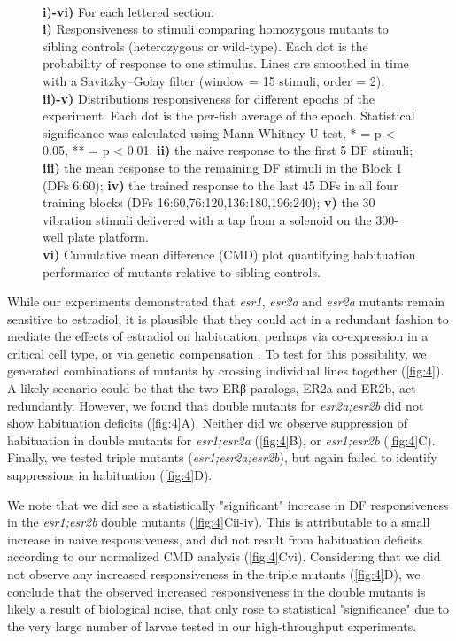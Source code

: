 \documentclass[9.5pt,lineno]{RandlettLab_elife}
\begin{document}
{\begin{figure}
\begin{fullwidth}
\begin{center}
{\\ \textbf{i)-vi)} For each lettered section: 
\\ \textbf{i)} Responsiveness to stimuli comparing homozygous mutants to sibling controls (heterozygous or wild-type). 
Each dot is the probability of response to one stimulus. Lines are smoothed in time with a Savitzky–Golay filter (window = 15 stimuli, order = 2).
\\ \textbf{ii)-v)} Distributions responsiveness for different epochs of the experiment. Each dot is the per-fish average of the epoch. 
Statistical significance was calculated using Mann-Whitney U test, * = p < 0.05, ** = p < 0.01.
\textbf{ii)} the naive response to the first 5 DF stimuli; \textbf{iii)} the mean response to the remaining DF stimuli in the Block 1 (DFs 6:60); \textbf{iv)} the trained response to the last 45 DFs in all four training blocks (DFs 16:60,76:120,136:180,196:240); \textbf{v)} the 30 vibration stimuli delivered with a tap from a solenoid on the 300-well plate platform.
\\ \textbf{vi)} Cumulative mean difference (CMD) plot quantifying habituation performance of mutants relative to sibling controls.
}
\label{fig:4}

\end{center}
\end{fullwidth}
\end{figure}

While our experiments demonstrated that \emph{esr1}, \emph{esr2a} and \emph{esr2a} mutants remain sensitive to estradiol, it is plausible that they could act in a redundant fashion to mediate the effects of estradiol on habituation, perhaps via co-expression in a critical cell type, or via genetic compensation \citep{El-Brolosy2019-uq}. 
To test for this possibility, we generated combinations of mutants by crossing individual lines together (\autoref{fig:4}). 
A likely scenario could be that the two ERβ paralogs, ER2a and ER2b, act redundantly. 
However, we found that double mutants for \emph{esr2a;esr2b} did not show habituation deficits (\autoref{fig:4}A).
Neither did we observe suppression of habituation in double mutants for \emph{esr1;esr2a} (\autoref{fig:4}B), or \emph{esr1;esr2b} (\autoref{fig:4}C). 
Finally, we tested triple mutants (\emph{esr1;esr2a;esr2b}), but again failed to identify suppressions in habituation (\autoref{fig:4}D).

We note that we did see a statistically "significant" increase in DF responsiveness in the \emph{esr1;esr2b} double mutants (\autoref{fig:4}Cii-iv). 
This is attributable to a small increase in naive responsiveness, and did not result from habituation deficits according to our normalized CMD analysis (\autoref{fig:4}Cvi).
Considering that we did not observe any increased responsiveness in the triple mutants (\autoref{fig:4}D), we conclude that the observed increased responsiveness in the double mutants is likely a result of biological noise, that only rose to statistical "significance" due to the very large number of larvae tested in our high-throughput experiments.

}
\end{document}
